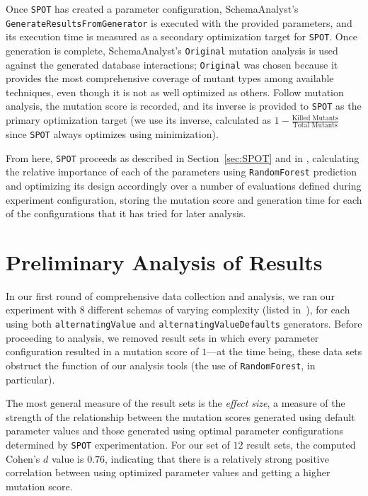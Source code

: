 \documentclass[a4paper,twocolumn]{article}
\begin{document}
Once \texttt{SPOT} has created a parameter configuration, SchemaAnalyst's \texttt{GenerateResultsFromGenerator} is executed with the provided parameters, and its execution time is measured as a secondary optimization target for \texttt{SPOT}. Once generation is complete, SchemaAnalyst's \texttt{Original} mutation analysis is used against the generated database interactions; \texttt{Original} was chosen because it provides the most comprehensive coverage of mutant types among available techniques, even though it is not as well optimized as others. Follow mutation analysis, the mutation score is recorded, and its inverse is provided to \texttt{SPOT} as the primary optimization target (we use its inverse, calculated as $1 - \frac{\text{Killed Mutants}}{\text{Total Mutants}}$ since \texttt{SPOT} always optimizes using minimization).

From here, \texttt{SPOT} proceeds as described in Section~\ref{sec:SPOT} and in \cite{SPOT2005}, calculating the relative importance of each of the parameters using \texttt{RandomForest} prediction and optimizing its design accordingly over a number of evaluations defined during experiment configuration, storing the mutation score and generation time for each of the configurations that it has tried for later analysis.

\section{Preliminary Analysis of Results}

In our first round of comprehensive data collection and analysis, we ran our experiment with $8$ different schemas of varying complexity (listed in~), for each using both \texttt{alternatingValue} and \texttt{alternatingValueDefaults} generators. Before proceeding to analysis, we removed result sets in which every parameter configuration resulted in a mutation score of $1$---at the time being, these data sets obstruct the function of our analysis tools (the use of \texttt{RandomForest}, in particular).

The most general measure of the result sets is the \textit{effect size}, a measure of the strength of the relationship between the mutation scores generated using default parameter values and those generated using optimal parameter configurations determined by \texttt{SPOT} experimentation. For our set of $12$ result sets, the computed Cohen's $d$ value is $0.76$, indicating that there is a relatively strong positive correlation between using optimized parameter values and getting a higher mutation score.
\end{document}
